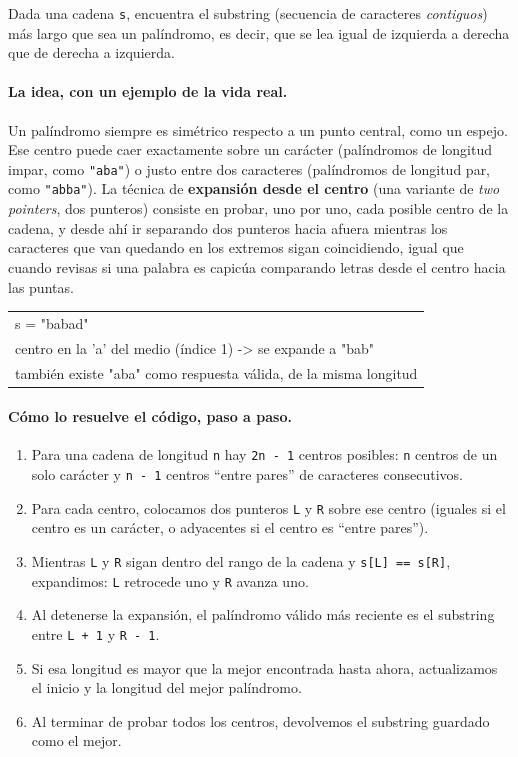 
Dada una cadena \texttt{s}, encuentra el substring (secuencia de caracteres
\emph{contiguos}) más largo que sea un palíndromo, es decir, que se lea
igual de izquierda a derecha que de derecha a izquierda.

\paragraph{La idea, con un ejemplo de la vida real.} Un palíndromo siempre
es simétrico respecto a un punto central, como un espejo. Ese centro puede
caer exactamente sobre un carácter (palíndromos de longitud impar, como
\texttt{"aba"}) o justo entre dos caracteres (palíndromos de longitud par,
como \texttt{"abba"}). La técnica de \textbf{expansión desde el centro} (una
variante de \emph{two pointers}, dos punteros) consiste en probar, uno por
uno, cada posible centro de la cadena, y desde ahí ir separando dos punteros
hacia afuera mientras los caracteres que van quedando en los extremos sigan
coincidiendo, igual que cuando revisas si una palabra es capicúa comparando
letras desde el centro hacia las puntas.

\begin{center}
\ttfamily
\begin{tabular}{l}
s = "babad"\\
centro en la 'a' del medio (índice 1) -> se expande a "bab"\\
también existe "aba" como respuesta válida, de la misma longitud\\
\end{tabular}
\end{center}

\paragraph{Cómo lo resuelve el código, paso a paso.}
\begin{enumerate}
  \item Para una cadena de longitud \texttt{n} hay \texttt{2n - 1} centros
        posibles: \texttt{n} centros de un solo carácter y \texttt{n - 1}
        centros ``entre pares'' de caracteres consecutivos.
  \item Para cada centro, colocamos dos punteros \texttt{L} y \texttt{R}
        sobre ese centro (iguales si el centro es un carácter, o adyacentes
        si el centro es ``entre pares'').
  \item Mientras \texttt{L} y \texttt{R} sigan dentro del rango de la cadena
        y \texttt{s[L] == s[R]}, expandimos: \texttt{L} retrocede uno y
        \texttt{R} avanza uno.
  \item Al detenerse la expansión, el palíndromo válido más reciente es el
        substring entre \texttt{L + 1} y \texttt{R - 1}.
  \item Si esa longitud es mayor que la mejor encontrada hasta ahora,
        actualizamos el inicio y la longitud del mejor palíndromo.
  \item Al terminar de probar todos los centros, devolvemos el substring
        guardado como el mejor.
\end{enumerate}

